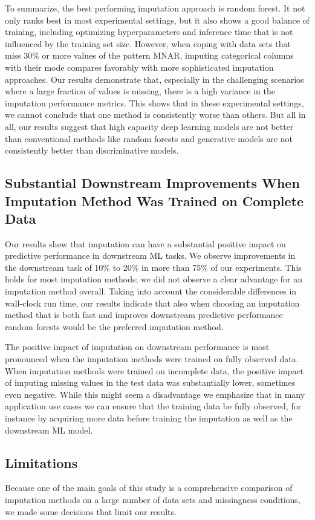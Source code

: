 \documentclass[utf8]{frontiersSCNS} %
\begin{document}
To summarize, the best performing imputation approach is random forest. It not only ranks best in most experimental settings, but it also shows a good balance of training, including optimizing hyperparameters and inference time that is not influenced by the training set size. However, when coping with data sets that miss $30\%$ or more values of the pattern MNAR, imputing categorical columns with their mode compares favorably with more sophisticated imputation approaches. Our results demonstrate that, especially in the challenging scenarios where a large fraction of values is missing, there is a high variance in the imputation performance metrics. This shows that in these experimental settings, we cannot conclude that one method is consistently worse than others. But all in all, our results suggest that high capacity deep learning models are not better than conventional methods like random forests and generative models are not consistently better than discriminative models.

\subsection{Substantial Downstream Improvements When Imputation Method Was Trained on Complete Data}
%
Our results show that imputation can have a substantial positive impact on predictive performance in downstream ML tasks. We observe improvements in the downstream task of 10\% to 20\% in more than 75\% of our experiments. This holds for most imputation methods; we did not observe a clear advantage for an imputation method overall. Taking into account the considerable differences in wall-clock run time, our results indicate that also when choosing an imputation method that is both fast and improves downstream predictive performance random forests would be the preferred imputation method.

The positive impact of imputation on downstream performance is most pronounced when the imputation methods were trained on fully observed data. When imputation methods were trained on incomplete data, the positive impact of imputing missing values in the test data was substantially lower, sometimes even negative. While this might seem a disadvantage we emphasize that in many application use cases we can ensure that the training data be fully observed, for instance by acquiring more data before training the imputation as well as the downstream ML model.


\subsection{Limitations}
\label{sec:limitations}
%
Because one of the main goals of this study is a comprehensive comparison of imputation methods on a large number of data sets and missingness conditions, we made some decisions that limit our results.
\end{document}
